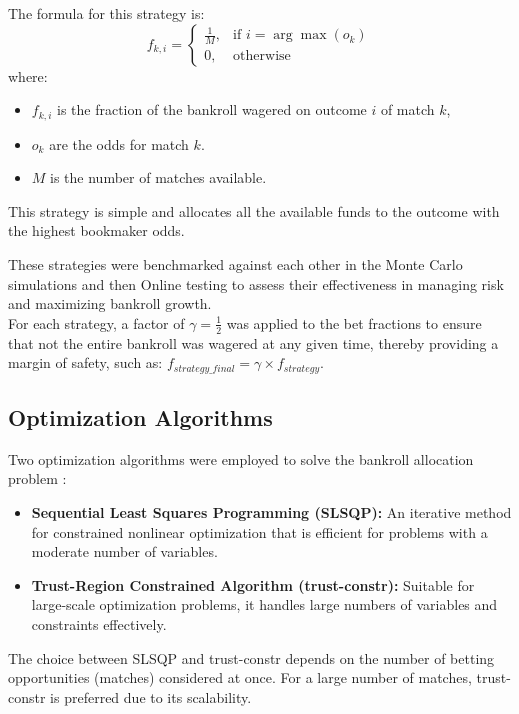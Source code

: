 \begin{itemize}
    The formula for this strategy is:
    \[
    f_{k,i} = 
    \begin{cases}
    \frac{1}{M}, & \text{if } i = \arg\max(o_k) \\
    0, & \text{otherwise}
    \end{cases}
    \]
    where:
    \begin{itemize}
        \item \( f_{k,i} \) is the fraction of the bankroll wagered on outcome \( i \) of match \( k \),
        \item \( o_k \) are the odds for match \( k \).
        \item \(M\) is the number of matches available.
    \end{itemize}
    This strategy is simple and allocates all the available funds to the outcome with the highest bookmaker odds.
\end{itemize}

These strategies were benchmarked against each other in the Monte Carlo simulations and then Online testing to assess their effectiveness in managing risk and maximizing bankroll growth. \\

For each strategy, a factor of \( \gamma = \frac{1}{2} \) was applied to the bet fractions to ensure that not the entire bankroll was wagered at any given time, thereby providing a margin of safety, such as: \(f_{strategy\_final} = \gamma \times f_{strategy}\).


\subsection{Optimization Algorithms}

Two optimization algorithms were employed to solve the bankroll allocation problem \cite{BoydVandenberghe2004}:

\begin{itemize}
    \item \textbf{Sequential Least Squares Programming (SLSQP):} An iterative method for constrained nonlinear optimization that is efficient for problems with a moderate number of variables.
    \item \textbf{Trust-Region Constrained Algorithm (trust-constr):} Suitable for large-scale optimization problems, it handles large numbers of variables and constraints effectively.
\end{itemize}

The choice between SLSQP and trust-constr depends on the number of betting opportunities (matches) considered at once. For a large number of matches, trust-constr is preferred due to its scalability.


